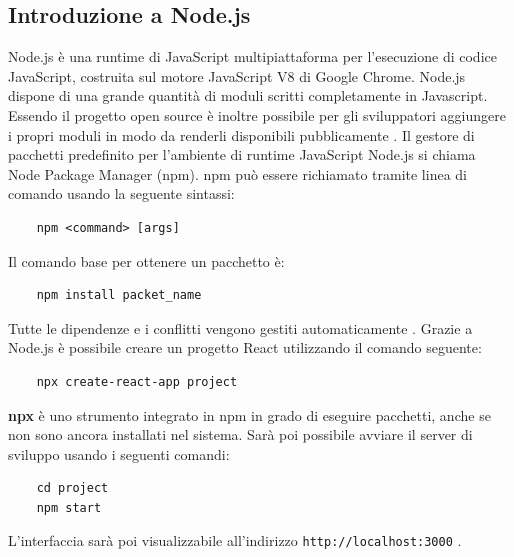 \subsection{Introduzione a Node.js}
\noindent Node.js \cite{nodejs} è una runtime di JavaScript multipiattaforma per l'esecuzione di codice JavaScript, costruita sul motore JavaScript V8 di Google Chrome.\newline
Node.js dispone di una grande quantità di moduli scritti completamente in Javascript.
Essendo il progetto open source è inoltre possibile per gli sviluppatori aggiungere i propri moduli in modo da renderli disponibili pubblicamente \cite{nodejs}.\newline 
\noindent Il gestore di pacchetti predefinito per l'ambiente di runtime JavaScript Node.js si chiama Node Package Manager (npm).
npm può essere richiamato tramite linea di comando usando la seguente sintassi:
\begin{verbatim}
    npm <command> [args]
\end{verbatim}
Il comando base per ottenere un pacchetto è:
\begin{verbatim}
    npm install packet_name
\end{verbatim}
Tutte le dipendenze e i conflitti vengono gestiti automaticamente \cite{npmDoc}.
\newline Grazie a Node.js è possibile creare un progetto React utilizzando il comando seguente:
\begin{verbatim}
    npx create-react-app project
\end{verbatim}
\textbf{npx} è uno strumento integrato in npm in grado di eseguire pacchetti, anche se non sono ancora installati nel sistema.\newline
Sarà poi possibile avviare il server di sviluppo usando i seguenti comandi:
\begin{verbatim}
    cd project
    npm start
\end{verbatim}
L'interfaccia sarà poi visualizzabile all'indirizzo \texttt{http://localhost:3000} \cite{reactGetStart}.
 
